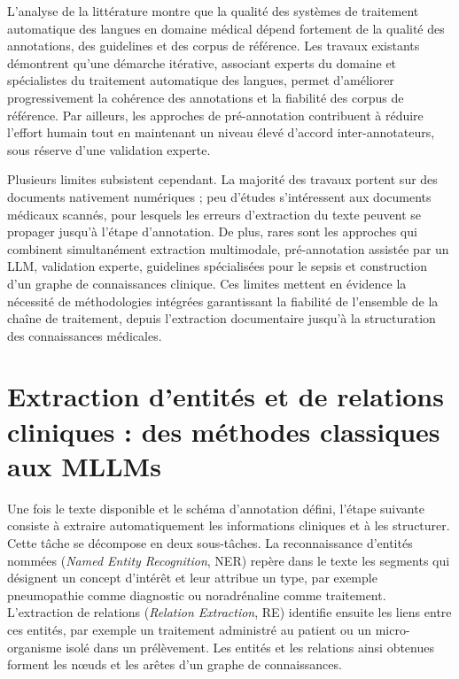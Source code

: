 L'analyse de la littérature montre que la qualité des systèmes de traitement automatique des langues en domaine médical dépend fortement de la qualité des annotations, des guidelines et des corpus de référence. Les travaux existants démontrent qu'une démarche itérative, associant experts du domaine et spécialistes du traitement automatique des langues, permet d'améliorer progressivement la cohérence des annotations et la fiabilité des corpus de référence. Par ailleurs, les approches de pré-annotation contribuent à réduire l'effort humain tout en maintenant un niveau élevé d'accord inter-annotateurs, sous réserve d'une validation experte.

Plusieurs limites subsistent cependant. La majorité des travaux portent sur des documents nativement numériques ; peu d'études s'intéressent aux documents médicaux scannés, pour lesquels les erreurs d'extraction du texte peuvent se propager jusqu'à l'étape d'annotation. De plus, rares sont les approches qui combinent simultanément extraction multimodale, pré-annotation assistée par un LLM, validation experte, guidelines spécialisées pour le sepsis et construction d'un graphe de connaissances clinique. Ces limites mettent en évidence la nécessité de méthodologies intégrées garantissant la fiabilité de l'ensemble de la chaîne de traitement, depuis l'extraction documentaire jusqu'à la structuration des connaissances médicales.

\section{Extraction d'entités et de relations cliniques : des méthodes classiques aux MLLMs}
\label{sec:extraction_er}

Une fois le texte disponible et le schéma d'annotation défini, l'étape suivante consiste à extraire automatiquement les informations cliniques et à les structurer. Cette tâche se décompose en deux sous-tâches. La reconnaissance d'entités nommées (\textit{Named Entity Recognition}, NER) repère dans le texte les segments qui désignent un concept d'intérêt et leur attribue un type, par exemple \og pneumopathie \fg{} comme diagnostic ou \og noradrénaline \fg{} comme traitement. L'extraction de relations (\textit{Relation Extraction}, RE) identifie ensuite les liens entre ces entités, par exemple un traitement administré au patient ou un micro-organisme isolé dans un prélèvement. Les entités et les relations ainsi obtenues forment les nœuds et les arêtes d'un graphe de connaissances.

